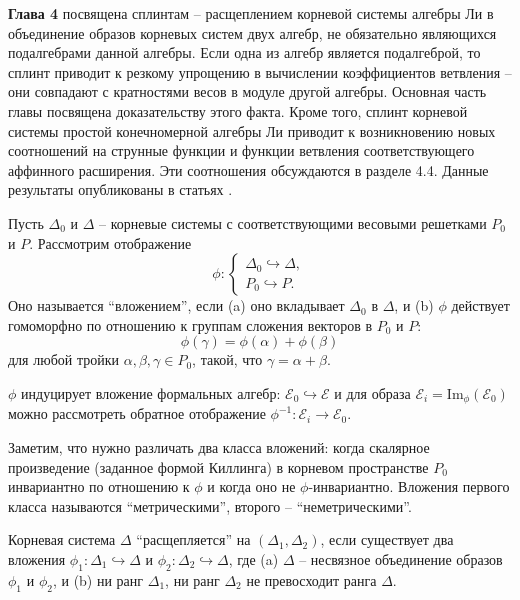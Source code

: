 \documentclass[14pt,autoref,href,facsimile
]{disser}
\begin{document}
\textbf{Глава 4} посвящена сплинтам -- расщеплением корневой системы алгебры Ли в объединение образов корневых систем двух алгебр, не обязательно являющихся подалгебрами данной алгебры. Если одна из алгебр является подалгеброй, то сплинт приводит к резкому упрощению в вычислении коэффициентов ветвления -- они совпадают с кратностями весов в модуле другой алгебры. Основная часть главы посвящена доказательству этого факта. Кроме того, сплинт корневой системы простой конечномерной алгебры Ли приводит к возникновению новых соотношений на струнные функции и функции ветвления соответствующего аффинного расширения. Эти соотношения обсуждаются в разделе 4.4.
Данные результаты опубликованы в статьях .


\begin{definition}
Пусть $\Delta _{0}$ и $\Delta$ -- корневые системы с соответствующими весовыми решетками $P_{0}$ и $P$. Рассмотрим отображение
\begin{equation}
\phi :\left\{
\begin{array}{l}
\Delta _{0}\hookrightarrow \Delta , \\
P_{0}\hookrightarrow P.
\end{array}
\right.
\end{equation}
Оно называется ``вложением'', если \newline
\noindent (a) оно вкладывает $\Delta _{0}$ в $\Delta $, и \newline
\noindent (b) $\phi$ действует гомоморфно по отношению к группам сложения векторов в $P_{0}$ и $P$:
\[
\phi (\gamma )=\phi (\alpha )+\phi (\beta )
\]
для любой тройки $\alpha ,\beta ,\gamma \in P_{0}$, такой, что $\gamma =\alpha+\beta $.
\end{definition}

$\phi$ индуцирует вложение формальных алгебр: ${\mathcal{E}}_0\hookrightarrow \mathcal{E}$ и для образа ${\mathcal{E}}_i=\mathrm{Im}_{\phi}\left( {\mathcal{E}}_0\right)$ можно рассмотреть обратное отображение $\phi^{-1}:{\mathcal{E}}_i \longrightarrow {\mathcal{E}}_0$.

Заметим, что нужно различать два класса вложений: когда скалярное произведение (заданное формой Киллинга) в корневом пространстве $P_0$ инвариантно по отношению к  $\phi$ и когда оно не  $\phi$-инвариантно. Вложения первого класса называются ``метрическими'', второго -- ``неметрическими''. 

\begin{definition}
Корневая система $\Delta$ ``расщепляется'' на  $(\Delta _{1},\Delta _{2})$, если существует два вложения  $\phi _{1}:\Delta _{1}\hookrightarrow \Delta $ и $\phi _{2}:\Delta _{2}\hookrightarrow \Delta $, где (a) $\Delta $ -- несвязное объединение образов $\phi _{1}$ и $\phi _{2}$, и (b) ни ранг  $\Delta _{1}$, ни ранг  $\Delta _{2}$ не превосходит ранга $\Delta $.
\end{definition}
\end{document}
